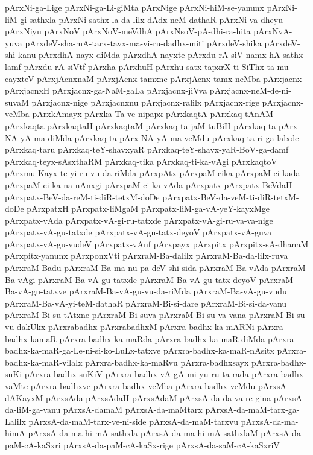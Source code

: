 {pArxNi-ga-Lige
pArxNi-ga-Li-giMta
pArxNige
pArxNi-hiM-se-yanunx
pArxNi-liM-gi-sathxla
pArxNi-sathx-la-da-lilx-dAdx-neM-dathaR
pArxNi-va-dheyu
pArxNiyu
pArxNoV
pArxNoV-meVdhA
pArxNsoV-pA-dhi-ra-hita
pArxNvA-yuva
pArxdeV-sha-mA-tarx-tavx-ma-vi-ru-dadhx-miti
pArxdeV-shika
pArxdeV-shi-kanu
pArxdhA-nayx-diMda
pArxdhA-nayxte
pArxdu-rA-siV-namx-hA-sathx-lamf
pArxdu-rA-siVtf
pArxha
pArxhuH
pArxhu-satx-tapxrX-ti-SiThx-ta-mu-cayxteV
pArxjAcnxnaM
pArxjAcnx-tamxne
pArxjAcnx-tamx-neMba
pArxjacnx
pArxjacnxH
pArxjacnx-ga-NaM-gaLa
pArxjacnx-jiVva
pArxjacnx-neM-de-ni-suvaM
pArxjacnx-nige
pArxjacnxnu
pArxjacnx-ralilx
pArxjacnx-rige
pArxjacnx-veMba
pArxkAmayx
pArxka-Ta-ve-nipapx
pArxkaqtA
pArxkaq-tAnAM
pArxkaqta
pArxkaqtaH
pArxkaqtaM
pArxkaq-ta-jaM-tuBiH
pArxkaq-ta-pArx-NA-yA-ma-diMda
pArxkaq-ta-pArx-NA-yA-ma-veMdu
pArxkaq-ta-ri-ga-lalxde
pArxkaq-taru
pArxkaq-teY-shavxyaR
pArxkaq-teY-shavx-yaR-BoV-ga-damf
pArxkaq-teyx-sAsxthaRM
pArxkaq-tika
pArxkaq-ti-ka-vAgi
pArxkaqtoV
pArxmu-Kayx-te-yi-ru-vu-da-riMda
pArxpAtx
pArxpaM-cika
pArxpaM-ci-kada
pArxpaM-ci-ka-na-nAnxgi
pArxpaM-ci-ka-vAda
pArxpatx
pArxpatx-BeVdaH
pArxpatx-BeV-da-reM-ti-diR-tetxM-doDe
pArxpatx-BeV-da-veM-ti-diR-tetxM-doDe
pArxpatxH
pArxpatx-liMgaM
pArxpatx-liM-ga-vA-yeY-kayxMge
pArxpatx-vAda
pArxpatx-vA-gi-ru-tatxde
pArxpatx-vA-gi-ru-va-va-nige
pArxpatx-vA-gu-tatxde
pArxpatx-vA-gu-tatx-deyoV
pArxpatx-vA-guva
pArxpatx-vA-gu-vudeV
pArxpatx-vAnf
pArxpayx
pArxpitx
pArxpitx-sA-dhanaM
pArxpitx-yanunx
pArxponxVti
pArxraM-Ba-dalilx
pArxraM-Ba-da-lilx-ruva
pArxraM-Badu
pArxraM-Ba-ma-nu-pa-deV-shi-sida
pArxraM-Ba-vAda
pArxraM-Ba-vAgi
pArxraM-Ba-vA-gu-tatxde
pArxraM-Ba-vA-gu-tatx-deyoV
pArxraM-Ba-vA-gu-tatxve
pArxraM-Ba-vA-gu-vu-da-riMda
pArxraM-Ba-vA-gu-vudu
pArxraM-Ba-vA-yi-teM-dathaR
pArxraM-Bi-si-dare
pArxraM-Bi-si-da-vanu
pArxraM-Bi-su-tAtxne
pArxraM-Bi-suva
pArxraM-Bi-su-va-vana
pArxraM-Bi-su-vu-dakUkx
pArxrabadhx
pArxrabadhxM
pArxra-badhx-ka-mARNi
pArxra-badhx-kamaR
pArxra-badhx-ka-maRda
pArxra-badhx-ka-maR-diMda
pArxra-badhx-ka-maR-ga-Le-ni-si-ko-LuLx-tatxve
pArxra-badhx-ka-maR-nAsitx
pArxra-badhx-ka-maR-vilalx
pArxra-badhx-ka-maRvu
pArxra-badhxsayx
pArxra-badhx-suKi
pArxra-badhx-suKiV
pArxra-badhx-vA-gA-mi-yu-ru-ta-rada
pArxra-badhx-vaMte
pArxra-badhxve
pArxra-badhx-veMba
pArxra-badhx-veMdu
pArxsA-dAKayxM
pArxsAda
pArxsAdaH
pArxsAdaM
pArxsA-da-da-va-re-gina
pArxsA-da-liM-ga-vanu
pArxsA-damaM
pArxsA-da-maMtarx
pArxsA-da-maM-tarx-ga-Lalilx
pArxsA-da-maM-tarx-ve-ni-side
pArxsA-da-maM-tarxvu
pArxsA-da-ma-himA
pArxsA-da-ma-hi-mA-sathxla
pArxsA-da-ma-hi-mA-sathxlaM
pArxsA-da-paM-cA-kaSxri
pArxsA-da-paM-cA-kaSx-rige
pArxsA-da-saM-cA-kaSxriV
}
